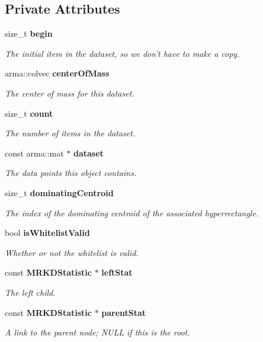 \subsection*{Private Attributes}
\begin{DoxyCompactItemize}
\item 
size\-\_\-t {\bf begin}
\begin{DoxyCompactList}\small\item\em The initial item in the dataset, so we don't have to make a copy. \end{DoxyCompactList}\item 
arma\-::colvec {\bf center\-Of\-Mass}
\begin{DoxyCompactList}\small\item\em The center of mass for this dataset. \end{DoxyCompactList}\item 
size\-\_\-t {\bf count}
\begin{DoxyCompactList}\small\item\em The number of items in the dataset. \end{DoxyCompactList}\item 
const arma\-::mat $\ast$ {\bf dataset}
\begin{DoxyCompactList}\small\item\em The data points this object contains. \end{DoxyCompactList}\item 
size\-\_\-t {\bf dominating\-Centroid}
\begin{DoxyCompactList}\small\item\em The index of the dominating centroid of the associated hyperrectangle. \end{DoxyCompactList}\item 
bool {\bf is\-Whitelist\-Valid}
\begin{DoxyCompactList}\small\item\em Whether or not the whitelist is valid. \end{DoxyCompactList}\item 
const {\bf M\-R\-K\-D\-Statistic} $\ast$ {\bf left\-Stat}
\begin{DoxyCompactList}\small\item\em The left child. \end{DoxyCompactList}\item 
const {\bf M\-R\-K\-D\-Statistic} $\ast$ {\bf parent\-Stat}
\begin{DoxyCompactList}\small\item\em A link to the parent node; N\-U\-L\-L if this is the root. \end{DoxyCompactList}\item 

\end{DoxyCompactItemize}
